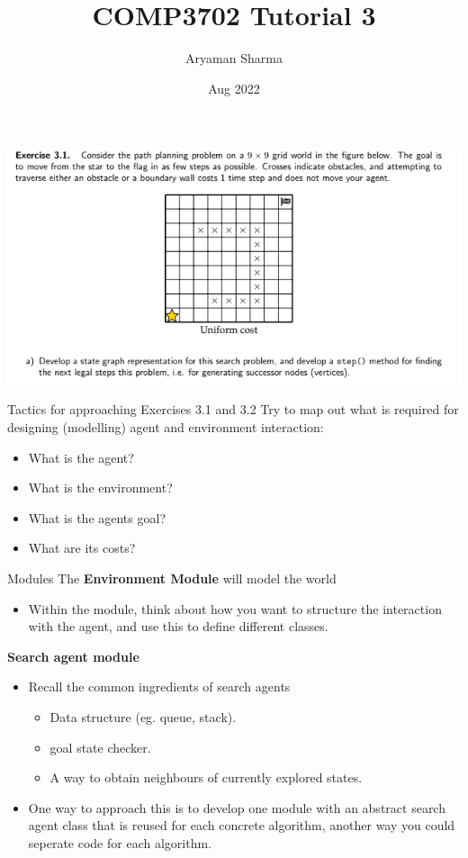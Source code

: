 \documentclass[11pt]{beamer}
\author{Aryaman Sharma}
\title{COMP3702 Tutorial 3}
\date{Aug 2022}
\begin{document}
\begin{frame}
	\titlepage
\end{frame}


\begin{frame}{3.1}
\includegraphics[scale=0.5]{31a.png}
\end{frame}

\begin{frame}{Tactics for approaching Exercises 3.1 and 3.2}
Try to map out what is required for designing (modelling) agent and environment interaction: \pause
\begin{itemize}
	\item What is the agent? \pause
	\item What is the environment? \pause
	\item What is the agents goal? \pause
	\item What are its costs? 
\end{itemize}
\end{frame}

\begin{frame}{Modules}
\pause
The \textbf{Environment Module} will model the world
\begin{itemize}
	\item Within the module, think about how you want to structure the interaction with the agent, and use this to define different classes.
\end{itemize}
\pause
\textbf{Search agent module} 
\begin{itemize}
	\item Recall the common ingredients of search agents
	\begin{itemize}
		\item Data structure (eg. queue, stack).
		\item goal state checker.
		\item A way to obtain neighbours of currently explored states.
	\end{itemize} \pause
	\item One way to approach this is to develop one module with an abstract search agent class that is reused for each concrete algorithm, another way you could seperate code for each algorithm.
\end{itemize}
\end{frame}
\end{document}
